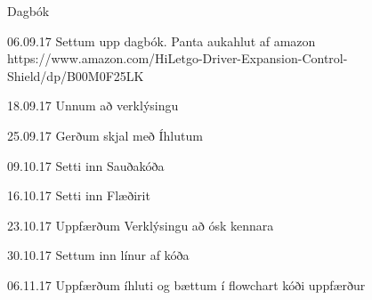 Dagbók

06.09.17
Settum upp dagbók. Panta aukahlut af amazon https://www.amazon.com/HiLetgo-Driver-Expansion-Control-Shield/dp/B00M0F25LK

18.09.17
Unnum að verklýsingu

25.09.17
Gerðum skjal með Íhlutum

09.10.17
Setti inn Sauðakóða

16.10.17
Setti inn Flæðirit

23.10.17
Uppfærðum Verklýsingu að ósk kennara

30.10.17
Settum inn línur af kóða

06.11.17
Uppfærðum íhluti og bættum í flowchart
kóði uppfærður